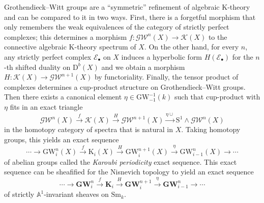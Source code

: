 \documentclass[11pt,leqno]{amsart}
\newcommand{\GW}{\mathbf{GW}}
\newcommand{\Esc}{{\mathscr{E}}}
\renewcommand{\1}{{\rm 1\hspace*{-0.4ex}%
\rule{0.1ex}{1.52ex}\hspace*{0.2ex}}}
\newcommand{\Sm}{\mathrm{Sm}}
\newcommand{\<}[1]{{\langle}#1 {\rangle}}
\newcommand{\Kr}{\mathrm{K}}
\newcommand{\GWr}{\mathrm{GW}}
\newcommand{\Kbf}{\mathbf{K}}
\newcommand{\Sr}{\mathrm{S}}
\newcommand{\Abb}{\mathbb{A}}
\newcommand{\Dr}{\mathrm{D}}
\theoremstyle{plain}
\theoremstyle{definition}
\theoremstyle{remark}
\numberwithin{equation}{section}
\begin{document}
Grothendieck--Witt groups are a ``symmetric'' refinement of algebraic $\Kr$-theory and can be compared to it in two ways. First, there is a forgetful morphism that only remembers the weak equivalences of the category of strictly perfect complexes; this determines a morphism $f:\mathscr{GW}^n(X)\to\mathscr{K}(X)$ to the connective algebraic $\Kr$-theory spectrum of $X$. On the other hand, for every $n$, any strictly perfect complex $\Esc_\bullet$ on $X$ induces a hyperbolic form $H(\Esc_\bullet)$ for the $n$-th shifted duality on $\Dr^b(X)$ and we obtain a morphism $H:\mathscr{K}(X)\to\mathscr{GW}^{n+1}(X)$ by functoriality. Finally, the tensor product of complexes determines a cup-product structure on Grothendieck--Witt groups. Then there exists a canonical element $\eta\in\GWr_{-1}^{-1}(k)$ such that cup-product with $\eta$ fits in an exact triangle \[\mathscr{GW}^n(X)\xrightarrow{f}\mathscr{K}(X)\xrightarrow{H}\mathscr{GW}^{n+1}(X)\xrightarrow{\eta\cup}\Sr^1\wedge\mathscr{GW}^n(X)\] in the homotopy category of spectra \cite[Theorem 6.1]{schlichtingHermitianKtheoryDerived2017} that is natural in $X$. Taking homotopy groups, this yields an exact sequence \[\cdots\to\GWr_i^{n}(X)\xrightarrow{f}\Kr_i(X)\xrightarrow{H}\GWr_i^{n+1}(X)\xrightarrow{\eta}\GWr_{i-1}^n(X)\to\cdots\] of abelian groups called the \emph{Karoubi periodicity} exact sequence. This exact sequence can be sheafified for the Nisnevich topology to yield an exact sequence \[\cdots\to\GW_i^{n}\xrightarrow{f}\Kbf_i\xrightarrow{H}\GW_i^{n+1}\xrightarrow{\eta}\GW_{i-1}^n\to\cdots\] of strictly $\Abb^1$-invariant sheaves on $\Sm_k$. 
\end{document}
